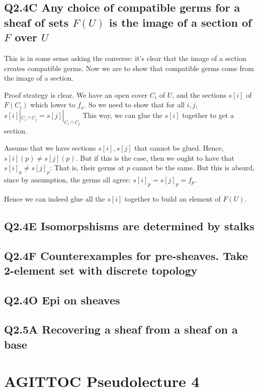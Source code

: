 \documentclass{book}
\theoremstyle{definition}
\begin{document}
\section{Q2.4C Any choice of compatible germs for a sheaf of sets $F(U)$ is the image of a section of $F$ over $U$}
This is in some sense asking the converse: it's clear that the image of a
section creates compatible germs.  Now we are to show that compatible germs
come from the image of a section.

Proof strategy is clear. We have an open cover $C_i$ of $U$,
and the sections $s[i]$ of $F(C_i)$ which lower to $f_x$. 
So we need to show that for all $i, j$, $s[i]|_{C_i \cap C_j}  = s[j]|_{C_i \cap C_j}$
This way, we can glue the $s[i]$ together to get a section.


Assume that we have sections $s[i], s[j]$ that cannot be glued. Hence,
$s[i](p) \neq s[j](p)$. But if this is the case, then we ought to
have that $s[i]_p \neq s[j]_p$: That is, their germs at $p$ cannot be the same.
But this is absurd, since by assumption, the germs all agree: $s[i]_p = s[j]_p = f_p$.


Hence we can indeed glue all the $s[i]$ together to build an element of $F(U)$.

\section{Q2.4E Isomorpshisms are determined by stalks}

\section{Q2.4F Counterexamples for pre-sheaves. Take 2-element set with discrete topology}
\section{Q2.4O Epi on sheaves}
\section{Q2.5A Recovering a sheaf from a sheaf on a base}


\chapter{AGITTOC Pseudolecture 4}
\end{document}
